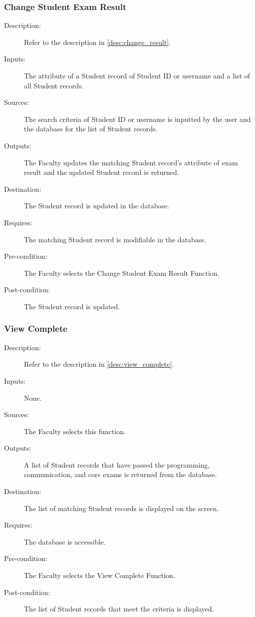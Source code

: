 \subsubsection{\large Change Student Exam Result} 
\begin{boxed} %
\begin{description}
\item[Description:]
   Refer to the description in \autoref{desc:change_result}.
\item[Inputs:]
   The attribute of a Student record of Student ID or username and a list of all
   Student records.
\item[Sources:]
   The search criteria of Student ID or username is inputted by the user and the
   database for the list of Student records.
\item[Outputs:]
   The Faculty updates the matching Student record's attribute of exam result
   and the updated Student record is returned.
\item[Destination:]
   The Student record is updated in the database.
\item[Requires:]
   The matching Student record is modifiable in the database.
\item[Pre-condition:]
   The Faculty selects the Change Student Exam Result Function.
\item[Post-condition:]
   The Student record is updated.
\end{description}
\end{boxed} %

\subsubsection{\large View Complete}  
\begin{boxed} %
\begin{description}
\item[Description:]
   Refer to the description in \autoref{desc:view_complete}.
\item[Inputs:]
   None.
\item[Sources:]
   The Faculty selects this function.
\item[Outputs:]
   A list of Student records that have passed the programming,
   communication, and core exams is returned from the database.
\item[Destination:]
   The list of matching Student records is displayed on the screen.
\item[Requires:]
   The database is accessible.
\item[Pre-condition:]
   The Faculty selects the View Complete Function.
\item[Post-condition:]
   The list of Student records that meet the criteria is displayed.
\end{description}
\end{boxed}

